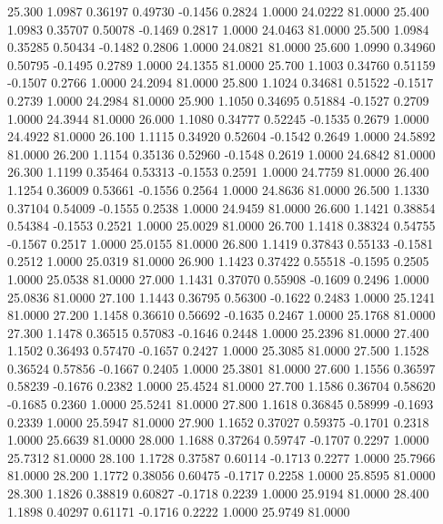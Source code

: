   25.300   1.0987   0.36197   0.49730  -0.1456   0.2824   1.0000  24.0222  81.0000
  25.400   1.0983   0.35707   0.50078  -0.1469   0.2817   1.0000  24.0463  81.0000
  25.500   1.0984   0.35285   0.50434  -0.1482   0.2806   1.0000  24.0821  81.0000
  25.600   1.0990   0.34960   0.50795  -0.1495   0.2789   1.0000  24.1355  81.0000
  25.700   1.1003   0.34760   0.51159  -0.1507   0.2766   1.0000  24.2094  81.0000
  25.800   1.1024   0.34681   0.51522  -0.1517   0.2739   1.0000  24.2984  81.0000
  25.900   1.1050   0.34695   0.51884  -0.1527   0.2709   1.0000  24.3944  81.0000
  26.000   1.1080   0.34777   0.52245  -0.1535   0.2679   1.0000  24.4922  81.0000
  26.100   1.1115   0.34920   0.52604  -0.1542   0.2649   1.0000  24.5892  81.0000
  26.200   1.1154   0.35136   0.52960  -0.1548   0.2619   1.0000  24.6842  81.0000
  26.300   1.1199   0.35464   0.53313  -0.1553   0.2591   1.0000  24.7759  81.0000
  26.400   1.1254   0.36009   0.53661  -0.1556   0.2564   1.0000  24.8636  81.0000
  26.500   1.1330   0.37104   0.54009  -0.1555   0.2538   1.0000  24.9459  81.0000
  26.600   1.1421   0.38854   0.54384  -0.1553   0.2521   1.0000  25.0029  81.0000
  26.700   1.1418   0.38324   0.54755  -0.1567   0.2517   1.0000  25.0155  81.0000
  26.800   1.1419   0.37843   0.55133  -0.1581   0.2512   1.0000  25.0319  81.0000
  26.900   1.1423   0.37422   0.55518  -0.1595   0.2505   1.0000  25.0538  81.0000
  27.000   1.1431   0.37070   0.55908  -0.1609   0.2496   1.0000  25.0836  81.0000
  27.100   1.1443   0.36795   0.56300  -0.1622   0.2483   1.0000  25.1241  81.0000
  27.200   1.1458   0.36610   0.56692  -0.1635   0.2467   1.0000  25.1768  81.0000
  27.300   1.1478   0.36515   0.57083  -0.1646   0.2448   1.0000  25.2396  81.0000
  27.400   1.1502   0.36493   0.57470  -0.1657   0.2427   1.0000  25.3085  81.0000
  27.500   1.1528   0.36524   0.57856  -0.1667   0.2405   1.0000  25.3801  81.0000
  27.600   1.1556   0.36597   0.58239  -0.1676   0.2382   1.0000  25.4524  81.0000
  27.700   1.1586   0.36704   0.58620  -0.1685   0.2360   1.0000  25.5241  81.0000
  27.800   1.1618   0.36845   0.58999  -0.1693   0.2339   1.0000  25.5947  81.0000
  27.900   1.1652   0.37027   0.59375  -0.1701   0.2318   1.0000  25.6639  81.0000
  28.000   1.1688   0.37264   0.59747  -0.1707   0.2297   1.0000  25.7312  81.0000
  28.100   1.1728   0.37587   0.60114  -0.1713   0.2277   1.0000  25.7966  81.0000
  28.200   1.1772   0.38056   0.60475  -0.1717   0.2258   1.0000  25.8595  81.0000
  28.300   1.1826   0.38819   0.60827  -0.1718   0.2239   1.0000  25.9194  81.0000
  28.400   1.1898   0.40297   0.61171  -0.1716   0.2222   1.0000  25.9749  81.0000
